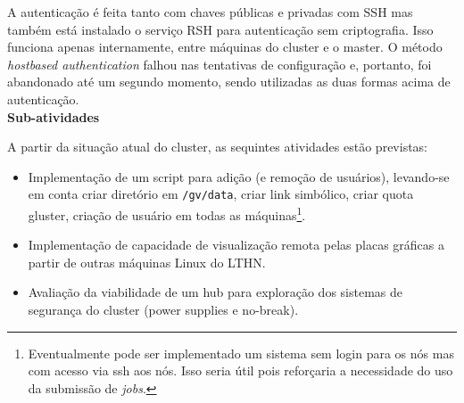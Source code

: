 A autenticação é feita tanto com chaves públicas e privadas com SSH mas também 
está instalado o serviço RSH para autenticação sem criptografia. Isso funciona 
apenas internamente, entre máquinas do cluster e o master. O método 
\textit{hostbased authentication} falhou nas tentativas de configuração e, portanto, foi abandonado até um segundo momento, sendo utilizadas as duas 
formas acima de autenticação.\\

\textbf{Sub-atividades}

A partir da situação atual do cluster, as sequintes atividades estão previstas:
\begin{itemize}
	\item[1] Implementação de um script para adição (e remoção de usuários), levando-se em conta criar diretório em \texttt{/gv/data}, criar link simbólico, criar quota gluster, criação de usuário em todas as máquinas\footnote{Eventualmente pode ser implementado um sistema sem login para os nós mas com acesso via ssh aos nós. Isso seria útil pois reforçaria a necessidade do uso da submissão de \textit{jobs}.}.
	\item[2] Implementação de capacidade de visualização remota pelas placas gráficas a partir de outras máquinas Linux do LTHN.
	\item[3] Avaliação da viabilidade de um hub para exploração dos sistemas de segurança do cluster (power supplies e no-break).

\end{itemize}
